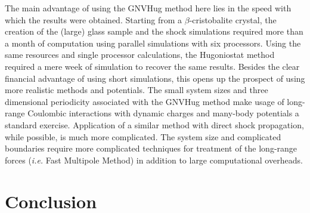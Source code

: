 \documentclass[aps,10pt,twocolumn]{revtex4}
\makeatletter
\newcommand{\ie}{\emph{i.e.}\@\xspace}
\makeatother
\begin{document}
The main advantage of using the GNVHug method here lies in the speed with which the results were
obtained. Starting from a $\beta$-cristobalite crystal, the creation of the (large) glass sample
and the shock simulations required more than a month of computation using parallel simulations
with six processors. Using  the same resources and single processor calculations,
the Hugoniostat method required a mere week of simulation to recover the same results. Besides
the clear financial advantage of 
using short simulations, this opens up the prospect of using more realistic methods and
potentials. The small system sizes and three dimensional periodicity associated with the GNVHug
method make usage of long-range Coulombic interactions with dynamic charges and many-body
potentials a standard exercise. Application of a similar method with direct shock propagation,
while possible, is much more complicated. The system size and complicated boundaries
require more complicated techniques for treatment of the long-range forces (\ie Fast
Multipole Method) in addition to large computational overheads.\\ 



\section{Conclusion}
\label{s:CCL}
\end{document}
